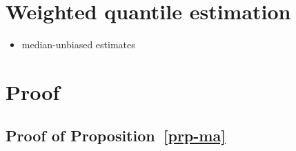 \documentclass[
  11pt,
  a4paper,
]{article}
\providecommand{\tightlist}{%
  \setlength{\itemsep}{0pt}\setlength{\parskip}{0pt}}\usepackage{longtable,booktabs,array}
\theoremstyle{plain}
\theoremstyle{plain}
\theoremstyle{remark}
\begin{document}
\printbibliography[heading=none]

\newpage
\appendix
\setcounter{section}{0}
\renewcommand{\thesection}{Appendix \Alph{section}}
\renewcommand{\thesubsection}{\Alph{section}.\arabic{subsection}}
\renewcommand{\thefigure}{A\arabic{figure}}
\renewcommand{\thetable}{A\arabic{table}}
\setcounter{figure}{0}
\setcounter{table}{0}

\section{Weighted quantile estimation}\label{sec-wq}

\begin{itemize}
\tightlist
\item
  median-unbiased estimates
\end{itemize}

\section{Proof}\label{sec-proof}

\subsection{\texorpdfstring{Proof of
Proposition~\ref{prp-ma}}{Proof of Proposition~}}\label{sec-proof_ma}
\end{document}

